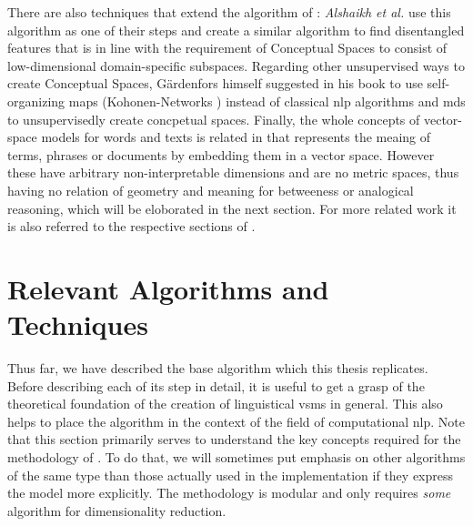 There are also techniques that extend the algorithm of \textcite{Derrac2015}: \textit{Alshaikh et al.} \cite{Alshaikh2019, Alshaikh2021} use this algorithm as one of their steps and create a similar algorithm to find disentangled features that is in line with the requirement of Conceptual Spaces to consist of low-dimensional domain-specific subspaces. Regarding other unsupervised ways to create Conceptual Spaces, Gärdenfors himself suggested in his book \cite{Gardenfors2000a} to use self-organizing maps (Kohonen-Networks \cite{Kohonen1997}) instead of classical \gls{nlp} algorithms and \gls{mds} to unsupervisedly create concpetual spaces. Finally, the whole concepts of vector-space models for words \cite{Mikolov2013} and texts \cite{Le2014,Devlin2019} is related in that represents the meaing of terms, phrases or documents by embedding them in a vector space. However these have arbitrary non-interpretable dimensions and are no metric spaces, thus having no relation of geometry and meaning for \eg betweeness or analogical reasoning, which will be eloborated in the next section. For more related work it is also referred to the respective sections of \mainalgos.


\section{Relevant Algorithms and Techniques}
\label{sec:required_algos}



Thus far, we have described the base algorithm which this thesis replicates. Before describing each of its step in detail, it is useful to get a grasp of the theoretical foundation of the creation of linguistical \glspl{vsm} in general. This also helps to place the algorithm in the context of the field of computational \gls{nlp}. Note that this section primarily serves to understand the key concepts required for the methodology of \textcite{Derrac2015}. To do that, we will sometimes put emphasis on other algorithms of the same type than those actually used in the implementation if they express the model more explicitly. The methodology is modular and \eg only requires \textit{some} algorithm for dimensionality reduction.


